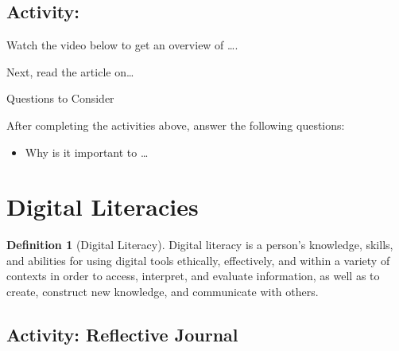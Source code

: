 \documentclass[
]{book}
\providecommand{\tightlist}{%
  \setlength{\itemsep}{0pt}\setlength{\parskip}{0pt}}
\theoremstyle{definition}
\newtheorem{definition}{Definition}[chapter]
\theoremstyle{definition}
\theoremstyle{definition}
\theoremstyle{definition}
\theoremstyle{remark}
\begin{document}
\hypertarget{activity}{%
\subsection*{Activity:}\label{activity}}

\begin{reflect}
Watch the video below to get an overview of \ldots.

Next, read the article on\ldots{}

{Questions to Consider}

After completing the activities above, answer the following questions:

\begin{itemize}
\tightlist
\item
  Why is it important to \ldots{}
\end{itemize}
\end{reflect}

\hypertarget{digital-literacies}{%
\section{Digital Literacies}\label{digital-literacies}}

\begin{definition}[Digital Literacy]
\protect\hypertarget{def:diglit}{}\label{def:diglit}Digital literacy is a person's knowledge, skills, and abilities for using digital tools ethically,
effectively, and within a variety of contexts in order to access, interpret, and evaluate
information, as well as to create, construct new knowledge, and communicate with
others.
\end{definition}

\hypertarget{activity-reflective-journal}{%
\subsection*{Activity: Reflective Journal}\label{activity-reflective-journal}}
\end{document}
